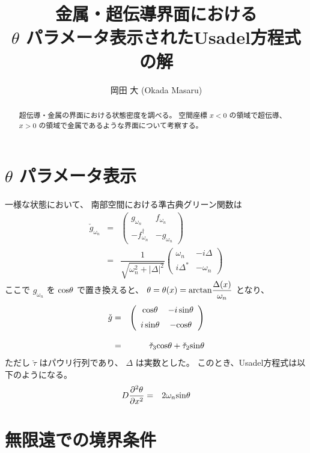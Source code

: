 \documentclass[uplatex,a4j,12pt,dvipdfmx]{jsarticle}
\title{金属・超伝導界面における \\ $\theta$ パラメータ表示されたUsadel方程式の解}
\author{
岡田 大 (Okada Masaru)
}
\begin{document}
\maketitle

\begin{abstract}
	超伝導・金属の界面における状態密度を調べる。
	空間座標 $x<0$ の領域で超伝導、$x>0$ の領域で金属であるような界面について考察する。
\end{abstract}

\section{$\theta$ パラメータ表示}

一様な状態において、
南部空間における準古典グリーン関数は
\begin{eqnarray}
	\check{g}_{\omega_{n}}
	&=&
	\left(
	\begin{array}{cc}
			g_{\omega_{n}}            & f_{\omega_{n}}
			\\[2mm]
			-f^{\dagger}_{\omega_{n}} & - g_{\omega_{n}}
		\end{array}
	\right)
	\nonumber \\[2mm] &=&
	\dfrac{1}{ \sqrt{ \omega_{n}^{2} + | \Delta |^{2} } }
	\left(
	\begin{array}{cc}
			\omega_{n}   & - i \Delta
			\\[2mm]
			i \Delta^{*} & - \omega_{n}
		\end{array}
	\right)
\end{eqnarray}
ここで $g_{\omega_{n}}$ を ${\rm cos} \theta$ で置き換えると、
$\theta = \theta(x) = {\rm arctan} \dfrac{\Delta(x)}{\omega_{n}}$
となり、
\begin{eqnarray}
	\check{g}
	&=&
	\left(
	\begin{array}{cc}
			{\rm cos} \theta        & - i \ \! {\rm sin} \theta
			\\[2mm]
			i \ \! {\rm sin} \theta & - {\rm cos} \theta
		\end{array}
	\right)
	\nonumber \\[3mm] &=&
	\check{\tau}_{3} {\rm cos} \theta
	+
	\check{\tau}_{2} {\rm sin} \theta
\end{eqnarray}
ただし $\check{\tau}$ はパウリ行列であり、
$\Delta$ は実数とした。
このとき、Usadel方程式は以下のようになる。
\begin{eqnarray}
	D
	\dfrac{\partial^{2} \theta}{\partial x^{2}}
	&=&
	2 \omega_{n} {\rm sin} \theta
\end{eqnarray}

\section{無限遠での境界条件}
\end{document}
